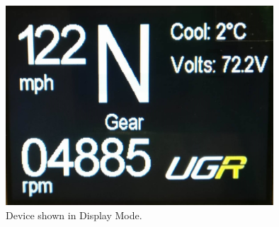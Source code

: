 \begin{figure}[H]
\begin{center}
\includegraphics[width=10cm]{Figures/display.jpg}
\end{center}
\caption{Device shown in Display Mode.}
\label{fig:display}
\end{figure}
